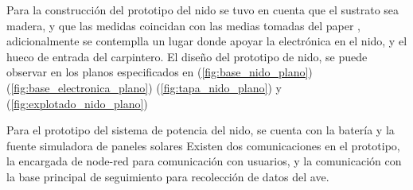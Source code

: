 %

Para la construcción del prototipo del nido se tuvo en cuenta que el sustrato sea madera, y que las medidas coincidan con las medias tomadas del paper \cite{ref:varepsilon_madera}, adicionalmente se contemplla un lugar donde apoyar la electrónica en el nido, y el hueco de entrada del carpintero.
El diseño del prototipo de nido, se puede observar en los planos especificados en (\ref{fig:base_nido_plano}) (\ref{fig:base_electronica_plano}) (\ref{fig:tapa_nido_plano}) y (\ref{fig:explotado_nido_plano}) 
\TBC
{}
\TBC

Para el prototipo del sistema de potencia del nido, se cuenta con la batería \TBC y la fuente simuladora de paneles solares \TBC 
{}
Existen dos comunicaciones en el prototipo, la encargada de node-red para comunicación con usuarios, y la comunicación con la base principal de seguimiento para recolección de datos del ave.


